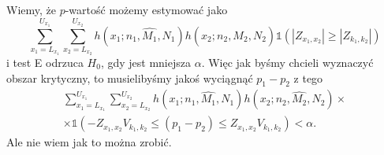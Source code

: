 \documentclass[12pt]{mwrep}
\newcommand{\1}[1]{\mathds{1}\left(#1\right)}
\begin{document}
Wiemy, że $p$-wartość możemy estymować jako
\begin{equation}
\sum_{x_1=L_{x_1}}^{U_{x_1}}\sum_{x_2=L_{x_2}}^{U_{x_2}} h(x_1;n_1,\hat{M_1},N_1)h(x_2;n_2,\hat{M_2},N_2) \1{|Z_{x_1,x_2}|\geq|Z_{k_1,k_2}|}
\end{equation}
i test E odrzuca $H_0$, gdy jest mniejsza $\alpha$. Więc jak byśmy chcieli wyznaczyć obszar krytyczny, to musielibyśmy jakoś wyciągnąć $p_1-p_2$ z tego
\begin{equation}
\begin{split}
\sum_{x_1=L_{x_1}}^{U_{x_1}}\sum_{x_2=L_{x_2}}^{U_{x_2}} h(x_1;n_1,\hat{M_1},N_1)h(x_2;n_2,\hat{M_2},N_2) \times \\
\times \1{-Z_{x_1,x_2}V_{k_1,k_2}\leq (p_1-p_2)\leq Z_{x_1,x_2}V_{k_1,k_2}} < \alpha.
\end{split}
\end{equation}
Ale nie wiem jak to można zrobić.
\end{document}
